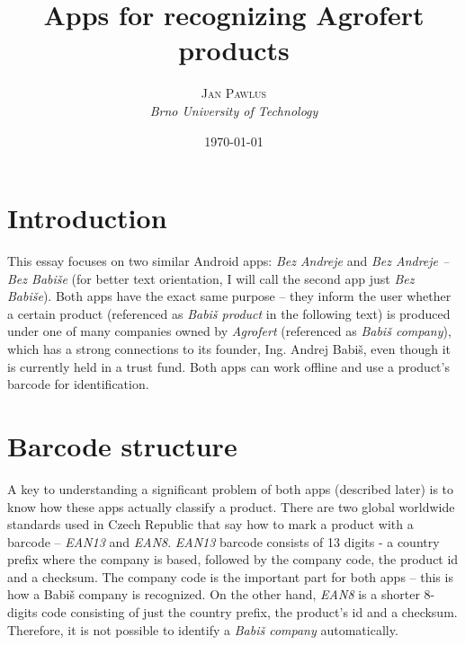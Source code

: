 \documentclass[12pt]{article} %
\title{\textbf{Apps for recognizing Agrofert products}\\ %
} %
\author{\textsc{Jan Pawlus} %
\\{\textit{Brno University of Technology}}} %
\date{\today} %
\begin{document}


\maketitle %


\section{Introduction} %

This essay focuses on two similar Android apps: \textit{Bez Andreje} and \textit{Bez Andreje – Bez Babiše} (for better text orientation, I will call the second app just \textit{Bez Babiše}). Both apps have the exact same purpose – they inform the user whether a certain product (referenced as \textit{Babiš product} in the following text) is produced under one of many companies owned by \textit{Agrofert} (referenced as \textit{Babiš company}), which has a strong connections to its founder, Ing. Andrej Babiš, even though it is currently held in a trust fund. Both apps can work offline and use a product’s barcode for identification.


\section{Barcode structure} %

A key to understanding a significant problem of both apps (described later) is to know how these apps actually classify a product. There are two global worldwide standards used in Czech Republic that say how to mark a product with a barcode – \textit{EAN13} and \textit{EAN8}. 
\textit{EAN13} barcode consists of 13 digits - a country prefix where the company is based, followed by the company code, the product id and a checksum. The company code is the important part for both apps – this is how a Babiš company is recognized.
On the other hand, \textit{EAN8} is a shorter 8-digits code consisting of just the country prefix, the product’s id and a checksum. Therefore, it is not possible to identify a \textit{Babiš company} automatically. \cite{barcodes}
\end{document}
